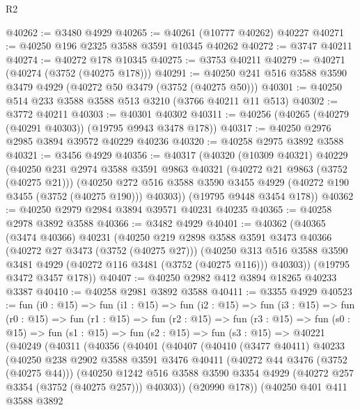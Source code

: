 \begin{lexlean}{R2}
\begin{coremodule}
@40262 := @3480 @4929
@40265 := @40261 (@10777 @40262) @40227
@40271 := @40250 @196 @2325 @3588 @3591 @10345 @40262
@40272 := @3747 @40211
@40274 := @40272 @178 @10345
@40275 := @3753 @40211
@40279 := @40271 (@40274 (@3752 (@40275 @178)))
@40291 := @40250 @241 @516 @3588 @3590 @3479 @4929 (@40272 @50 @3479 (@3752 (@40275 @50)))
@40301 := @40250 @514 @233 @3588 @3588 @513 @3210 (@3766 @40211 @11 @513)
@40302 := @3772 @40211
@40303 := @40301 @40302
@40311 := @40256 (@40265 (@40279 (@40291 @40303)) (@19795 @9943 @3478 @178))
@40317 := @40250 @2976 @2985 @3894 @39572 @40229 @40236
@40320 := @40258 @2975 @3892 @3588
@40321 := @3456 @4929
@40356 := @40317
    (@40320
      (@10309 @40321)
      @40229
      (@40250
        @231
        @2974
        @3588
        @3591
        @9863
        @40321
        (@40272 @21 @9863 (@3752 (@40275 @21)))
        (@40250 @272 @516 @3588 @3590 @3455 @4929 (@40272 @190 @3455 (@3752 (@40275 @190))) @40303))
      (@19795 @9448 @3454 @178))
@40362 := @40250 @2979 @2984 @3894 @39571 @40231 @40235
@40365 := @40258 @2978 @3892 @3588
@40366 := @3482 @4929
@40401 := @40362
    (@40365
      (@3474 @40366)
      @40231
      (@40250
        @219
        @2898
        @3588
        @3591
        @3473
        @40366
        (@40272 @27 @3473 (@3752 (@40275 @27)))
        (@40250 @313 @516 @3588 @3590 @3481 @4929 (@40272 @116 @3481 (@3752 (@40275 @116))) @40303))
      (@19795 @3472 @3457 @178))
@40407 := @40250 @2982 @412 @3894 @18265 @40233 @3387
@40410 := @40258 @2981 @3892 @3588
@40411 := @3355 @4929
@40523 := fun (i0 : @15) =>
  fun (i1 : @15) =>
  fun (i2 : @15) =>
  fun (i3 : @15) =>
  fun (r0 : @15) =>
  fun (r1 : @15) =>
  fun (r2 : @15) =>
  fun (r3 : @15) =>
  fun (s0 : @15) =>
  fun (s1 : @15) =>
  fun (s2 : @15) =>
  fun (s3 : @15) =>
  @40221
    (@40249
      (@40311
        (@40356
          (@40401
            (@40407
              (@40410
                (@3477 @40411)
                @40233
                (@40250
                  @238
                  @2902
                  @3588
                  @3591
                  @3476
                  @40411
                  (@40272 @44 @3476 (@3752 (@40275 @44)))
                  (@40250
                    @1242
                    @516
                    @3588
                    @3590
                    @3354
                    @4929
                    (@40272 @257 @3354 (@3752 (@40275 @257)))
                    @40303))
                (@20990 @178))
              (@40250
                @401
                @411
                @3588
                @3892

\end{coremodule}
\end{lexlean}
